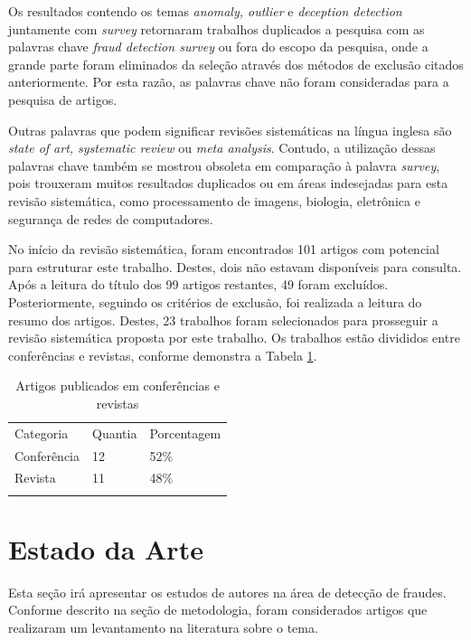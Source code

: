 \documentclass[smallextended]{svjour3}
\begin{document}
Os resultados contendo os temas \emph{anomaly, outlier} e \emph{deception detection} juntamente com \emph{survey} retornaram trabalhos duplicados a pesquisa com as palavras chave \emph{fraud detection survey} ou fora do escopo da pesquisa, onde a grande parte foram eliminados da seleção através dos métodos de exclusão citados anteriormente. Por esta razão, as palavras chave não foram consideradas para a pesquisa de artigos.

Outras palavras que podem significar revisões sistemáticas na língua inglesa são \emph{state of art, systematic review} ou \emph{meta analysis}. Contudo, a utilização dessas palavras chave também se mostrou obsoleta em comparação à palavra \emph{survey}, pois trouxeram muitos resultados duplicados ou em áreas indesejadas para esta revisão sistemática, como processamento de imagens, biologia, eletrônica e segurança de redes de computadores.

No início da revisão sistemática, foram encontrados 101 artigos com potencial para estruturar este trabalho. Destes, dois não estavam disponíveis para consulta. Após a leitura do título dos 99 artigos restantes, 49 foram excluídos. Posteriormente, seguindo os critérios de exclusão, foi realizada a leitura do resumo dos artigos. Destes, 23 trabalhos foram selecionados para prosseguir a revisão sistemática proposta por este trabalho. Os trabalhos estão divididos entre conferências e revistas, conforme demonstra a Tabela \ref{tab:conferenciasrevistas}.

\begin{table}
	\caption{Artigos publicados em conferências e revistas}
	\label{tab:conferenciasrevistas}       %
	\begin{tabular}[!Ht]{lll}
		\hline\noalign{\smallskip}
		Categoria & Quantia & Porcentagem  \\
		\noalign{\smallskip}\hline\noalign{\smallskip}
		Conferência & 12 & 52\% \\
		Revista & 11 & 48\% \\
		\noalign{\smallskip}\hline
	\end{tabular}
\end{table}

\section{Estado da Arte}
\label{sec:4}

Esta seção irá apresentar os estudos de autores na área de detecção de fraudes. Conforme descrito na seção de metodologia, foram considerados artigos que realizaram um levantamento na literatura sobre o tema.
\end{document}
